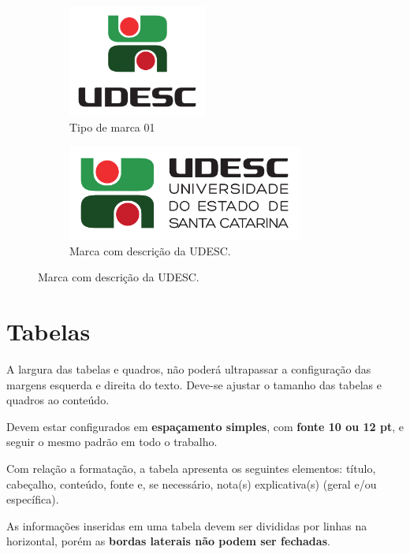 \begin{figure}[!htbp]
\flushleft 
	\caption{Outras marcas da UDESC.}
	\begin{subfigure}[b]{0.5\linewidth}
		\centering
		\includegraphics[width=0.5\textwidth]{cor_vertical_pdf.pdf}
		\caption{Tipo de marca 01}
	\end{subfigure}%
	\begin{subfigure}[b]{0.5\linewidth}
		\centering
		\includegraphics[width=0.85\textwidth]{cor_horizontal_ass_1_pdf.pdf}
		\caption{Marca com descrição da UDESC.}
	\end{subfigure}
\end{figure}

\section{Tabelas}

A largura das tabelas e quadros, não poderá ultrapassar a configuração das margens esquerda
e direita do texto. Deve-se ajustar o tamanho das tabelas e quadros ao conteúdo.

Devem estar configurados em \textbf{espaçamento simples}, com \textbf{fonte 10 ou 12 pt}, e seguir o mesmo
padrão em todo o trabalho.

Com relação a formatação, a tabela apresenta os seguintes elementos: título, cabeçalho,
conteúdo, fonte e, se necessário, nota(s) explicativa(s) (geral e/ou específica).

As informações inseridas em uma tabela devem ser divididas por linhas na horizontal, porém as \textbf{bordas laterais não podem ser fechadas}.

